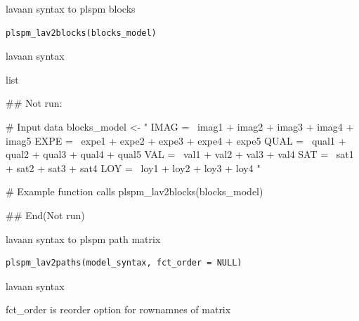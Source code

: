 \documentclass[a4paper]{book}
\begin{document}
%
\begin{Description}
lavaan syntax to plspm blocks
\end{Description}
%
\begin{Usage}
\begin{verbatim}
plspm_lav2blocks(blocks_model)
\end{verbatim}
\end{Usage}
%
\begin{Arguments}
\begin{ldescription}
\item[\code{blocks\_model}] lavaan syntax
\end{ldescription}
\end{Arguments}
%
\begin{Value}
list
\end{Value}
%
\begin{Examples}
\begin{ExampleCode}
\#\# Not run: 

# Input data
blocks_model <- "
IMAG =~ imag1 + imag2 + imag3 + imag4 + imag5
EXPE =~ expe1 + expe2 + expe3 + expe4 + expe5
QUAL =~ qual1 + qual2 + qual3 + qual4 + qual5
VAL =~ val1 + val2 + val3 + val4
SAT =~ sat1 + sat2 + sat3 + sat4
LOY =~ loy1 + loy2 + loy3 + loy4
"

# Example function calls
plspm_lav2blocks(blocks_model)


## End(Not run)
\end{ExampleCode}
\end{Examples}
%
\begin{Description}
lavaan syntax to plspm path matrix
\end{Description}
%
\begin{Usage}
\begin{verbatim}
plspm_lav2paths(model_syntax, fct_order = NULL)
\end{verbatim}
\end{Usage}
%
\begin{Arguments}
\begin{ldescription}
\item[\code{model\_syntax}] lavaan syntax

\item[\code{fct\_order}] fct\_order is reorder option for rownamnes of matrix
\end{ldescription}
\end{Arguments}
\end{document}
